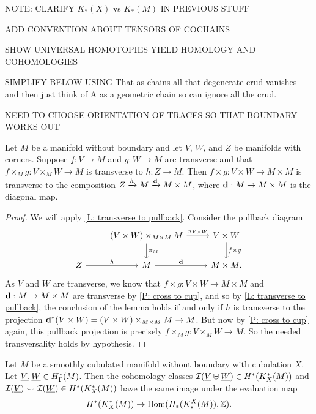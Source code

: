 \documentclass{amsart}
\begin{document}
 NOTE: CLARIFY $K_*(X)$ vs $K_*(M)$ IN PREVIOUS STUFF

ADD CONVENTION ABOUT TENSORS OF COCHAINS

SHOW UNIVERSAL HOMOTOPIES YIELD HOMOLOGY AND COHOMOLOGIES

SIMPLIFY BELOW USING That as chains all that degenerate crud vanishes and then just think of A as a geometric chain so can ignore all the crud.

NEED TO CHOOSE ORIENTATION OF TRACES SO THAT BOUNDARY WORKS OUT


\begin{lemma}\label{L: trans diag cube}
Let $M$ be a manifold without boundary and let $V$, $W$, and $Z$ be  manifolds with corners. Suppose $f:V\to M$ and $g:W\to M$ are transverse and that $f\times_Mg:V\times_MW\to M$ is transverse to $h:Z\to M$. Then $f\times g:V\times W\to M\times M$ is transverse to the composition $Z\xrightarrow{h}M\xrightarrow{\mathbf{d}}M\times M$, where $\mathbf{d}:M\to M\times M$ is the diagonal map.
\end{lemma}
\begin{proof}
We will apply \cref{L: transverse to pullback}. Consider the pullback diagram
	\[
	\begin{tikzcd}
		& (V \times W)\times_{M\times M} M \arrow[r, "\pi_{V\times W}"] \arrow[d, "\pi_M"] & V\times W \arrow[d, "f\times g"] \\
		Z \arrow[r, "h"] & M \arrow[r, "\diag"]&  M\times M.
	\end{tikzcd}
	\]
As $V$ and $W$ are transverse, we know that $f\times g:V\times W\to M\times M$ and $\mathbf{d}:M\to M\times M$ are transverse by \cref{P: cross to cup}, and so by \cref{L: transverse to pullback}, the conclusion of the lemma holds if and only if $h$ is transverse to the projection $\mathbf{d}^*(V\times W)=(V \times W)\times_{M\times M} M \to M$. But now by \cref{P: cross to cup} again, this pullback projection is precisely $f\times_Mg:V\times_MW\to M$. So the needed transversality holds by hypothesis.
\end{proof}



\begin{proposition}
Let $M$ be a smoothly cubulated manifold without boundary with cubulation $X$. Let $\underline{V},\underline{W}\in H^*_\Gamma(M)$. Then the cohomology classes $\mathcal{I}(\underline{V}\uplus\underline{W})\in H^*(K_X^*(M))$ and $\mathcal{I}(\underline{V}) \smile \mathcal{I}(\underline{W})\in H^*(K_X^*(M))$ have the same image under the evaluation map $$H^*(K_X^*(M))\to \textup{Hom}(H_*(K_*^X(M)),\mathbb{Z}).$$
\end{proposition}
\end{document}
